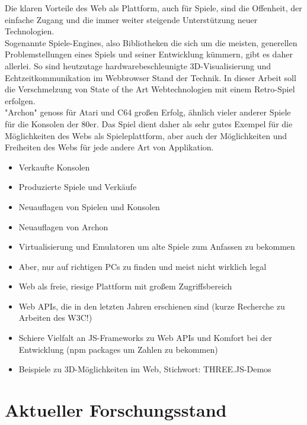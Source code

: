 Die klaren Vorteile des Web als Plattform, auch für Spiele, sind die Offenheit, der einfache Zugang und die immer weiter steigende Unterstützung neuer Technologien.\\
Sogenannte Spiele-Engines, also Bibliotheken die sich um die meisten, generellen Problemstellungen eines Spiels und seiner Entwicklung kümmern, gibt es daher allerlei.
So sind heutzutage hardwarebeschleunigte 3D-Visualisierung und Echtzeitkommunikation im Webbrowser Stand der Technik.
In dieser Arbeit soll die Verschmelzung von State of the Art Webtechnologien mit einem Retro-Spiel erfolgen.\\
"Archon" genoss für Atari und C64 großen Erfolg, ähnlich vieler anderer Spiele für die Konsolen der 80er.
Das Spiel dient daher als sehr gutes Exempel für die Möglichkeiten des Webs als Spieleplattform, aber auch der Möglichkeiten und Freiheiten des Webs für jede andere Art von Applikation.
\begin{itemize}
	\item Verkaufte Konsolen
	\item Produzierte Spiele und Verkäufe
	\item Neuauflagen von Spielen und Konsolen
	\item Neuauflagen von Archon 
	\item Virtualisierung und Emulatoren um alte Spiele zum Anfassen zu bekommen
	\item Aber, nur auf richtigen PCs zu finden und meist nicht wirklich legal
	\item Web als freie, riesige Plattform mit großem Zugriffsbereich
	\item Web APIs, die in den letzten Jahren erschienen sind (kurze Recherche zu Arbeiten des W3C!)
	\item Schiere Vielfalt an JS-Frameworks zu Web APIs und Komfort bei der Entwicklung (npm packages um Zahlen zu bekommen)
	\item Beispiele zu 3D-Möglichkeiten im Web, Stichwort: THREE.JS-Demos
\end{itemize}

\section{Aktueller Forschungsstand}
\label{sec:aktueller_forschungsstand}

